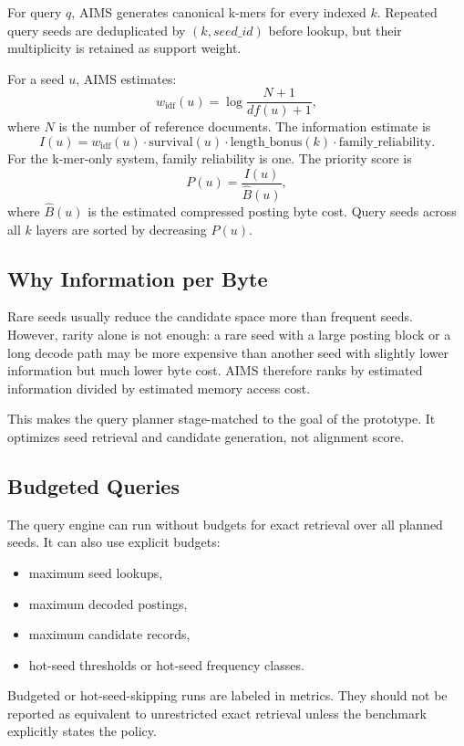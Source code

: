 \documentclass[11pt]{article}
\begin{document}
For query \(q\), AIMS generates canonical k-mers for every indexed \(k\). Repeated query seeds are deduplicated by \((k, seed\_id)\) before lookup, but their multiplicity is retained as support weight.

For a seed \(u\), AIMS estimates:
\[
  w_{\mathrm{idf}}(u) = \log \frac{N+1}{df(u)+1},
\]
where \(N\) is the number of reference documents. The information estimate is
\[
  I(u) = w_{\mathrm{idf}}(u) \cdot \text{survival}(u) \cdot \text{length\_bonus}(k) \cdot \text{family\_reliability}.
\]
For the k-mer-only system, family reliability is one. The priority score is
\[
  P(u) = \frac{I(u)}{\widehat{B}(u)},
\]
where \(\widehat{B}(u)\) is the estimated compressed posting byte cost. Query seeds across all \(k\) layers are sorted by decreasing \(P(u)\).

\subsection{Why Information per Byte}

Rare seeds usually reduce the candidate space more than frequent seeds. However, rarity alone is not enough: a rare seed with a large posting block or a long decode path may be more expensive than another seed with slightly lower information but much lower byte cost. AIMS therefore ranks by estimated information divided by estimated memory access cost.

This makes the query planner stage-matched to the goal of the prototype. It optimizes seed retrieval and candidate generation, not alignment score.

\subsection{Budgeted Queries}

The query engine can run without budgets for exact retrieval over all planned seeds. It can also use explicit budgets:
\begin{itemize}
  \item maximum seed lookups,
  \item maximum decoded postings,
  \item maximum candidate records,
  \item hot-seed thresholds or hot-seed frequency classes.
\end{itemize}

Budgeted or hot-seed-skipping runs are labeled in metrics. They should not be reported as equivalent to unrestricted exact retrieval unless the benchmark explicitly states the policy.
\end{document}
